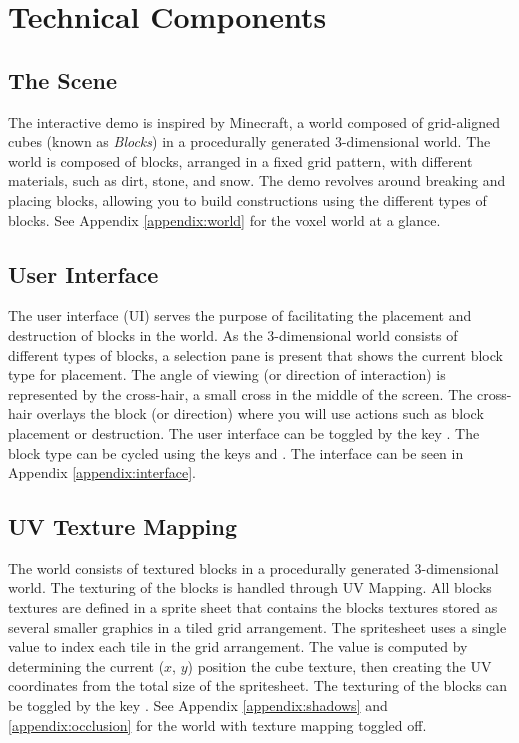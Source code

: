 \documentclass[a4paper,11pt,titlepage]{scrartcl}
\begin{document}
\section{Technical Components}
\subsection{The Scene}
\label{section:scene}
The interactive demo is inspired by Minecraft, a world composed of grid-aligned cubes (known as \textit{Blocks}) in a procedurally generated 3-dimensional world. The world is composed of blocks, arranged in a fixed grid pattern, with different materials, such as dirt, stone, and snow. The demo revolves around breaking and placing blocks, allowing you to build constructions using the different types of blocks.
\vskip 2.5mm\noindent
See Appendix \ref{appendix:world} for the voxel world at a glance.
  
\subsection{User Interface}
\label{section:interface}
The user interface (UI) serves the purpose of facilitating the placement and destruction of blocks in the world. As the 3-dimensional world consists of different types of blocks, a selection pane is present that shows the current block type for placement. The angle of viewing (or direction of interaction) is represented by the cross-hair, a small cross in the middle of the screen. The cross-hair overlays the block (or direction) where you will use actions such as block placement or destruction.
\vskip 2.5mm\noindent
The user interface can be toggled by the key . The block type can be cycled using the keys  and . The interface can be seen in Appendix \ref{appendix:interface}. 

\subsection{UV Texture Mapping}
\label{section:texture}
The world consists of textured blocks in a procedurally generated 3-dimensional world. The texturing of the blocks is handled through UV Mapping. All blocks textures are defined in a sprite sheet that contains the blocks textures stored as several smaller graphics in a tiled grid arrangement. The spritesheet uses a single value to index each tile in the grid arrangement. The value is computed by determining the current ($x$, $y$) position the cube texture, then creating the UV coordinates from the total size of the spritesheet.
\vskip 2.5mm\noindent
The texturing of the blocks can be toggled by the key . See Appendix \ref{appendix:shadows} and \ref{appendix:occlusion} for the world with texture mapping toggled off.
\end{document}

